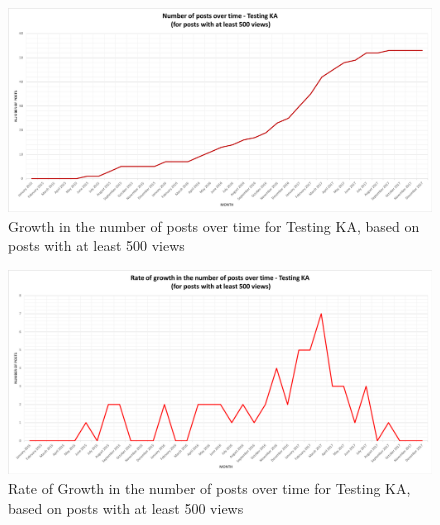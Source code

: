 \documentclass{sigchi}
\begin{document}
\begin{figure}[ht]
	\centering
\includegraphics[width=\textwidth,height=\textheight,keepaspectratio]{RQ5-TestingNumPostsOverTime_500Views.png}
    \caption{Growth in the number of posts over time for Testing KA, based on posts with at least 500 views}
    \label{fig:7TestingGrowthInNumPosts500Views}
\end{figure}
\begin{figure}[ht]
	\centering
\includegraphics[width=\textwidth,height=\textheight,keepaspectratio]{RQ5-TestingRateNumPostsOverTime_500Views.png}
    \caption{Rate of Growth in the number of posts over time for Testing KA, based on posts with at least 500 views}
    \label{fig:7.1TestingRateGrowthInNumPosts500Views}
\end{figure}
\end{document}
